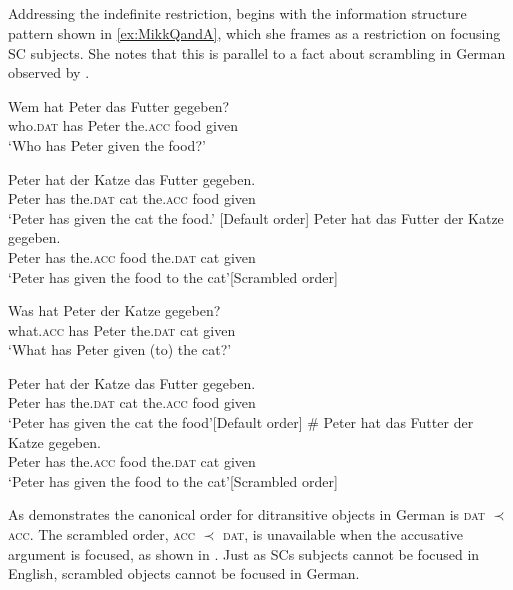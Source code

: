 \documentclass[
	letterpaper,
]{article}
\begin{document}
\subsection{\textcite{heycock2012specification}}\label{sec:Heycock}
Addressing the indefinite restriction, \textcite{heycock2012specification} begins with the information structure pattern shown in \ref{ex:MikkQandA}, which she frames as a restriction on focusing SC subjects.
She notes that this is parallel to a fact about scrambling in German observed by \textcite{lenerz1977zur}.
\begin{exe}
	\ex
	\begin{xlist}
		\ex \gll Wem hat Peter das Futter gegeben?\\
			who.\textsc{dat} has Peter the.\textsc{acc} food given\\
		\trans `Who has Peter given the food?'
		\begin{xlist}
			\ex \gll Peter hat der Katze das Futter gegeben.\\
				Peter has the.\textsc{dat} cat the.\textsc{acc} food given\\
			\trans `Peter has given the cat the food.' \hfill[Default order]
			\ex \gll Peter hat das Futter der Katze gegeben.\\
			Peter has the.\textsc{acc} food the.\textsc{dat} cat given\\
			\trans `Peter has given the food to the cat'\hfill[Scrambled order]	
		\end{xlist}
		\ex \gll Was hat Peter der Katze gegeben?\\
			what.\textsc{acc} has Peter the.\textsc{dat} cat given\\
		\trans `What has Peter given (to) the cat?'
		\begin{xlist}
			\ex \gll Peter hat der Katze das Futter gegeben.\\
			Peter has the.\textsc{dat} cat the.\textsc{acc} food given\\
			\trans `Peter has given the cat the food'\hfill[Default order]
			\ex \gll \# Peter hat das Futter der Katze gegeben.\\
			{} Peter has the.\textsc{acc} food the.\textsc{dat} cat given\\
			\trans `Peter has given the food to the cat'\hfill[Scrambled order]	
		\end{xlist}
	\end{xlist}
\end{exe}
As \Last demonstrates the canonical order for ditransitive objects in German is \textsc{dat} $\prec$ \textsc{acc}.
The scrambled order, \textsc{acc} $\prec$ \textsc{dat}, is unavailable when the accusative argument is focused, as shown in \Last[b-ii]. 
Just as SCs subjects cannot be focused in English, scrambled objects cannot be focused in German.
\end{document}
